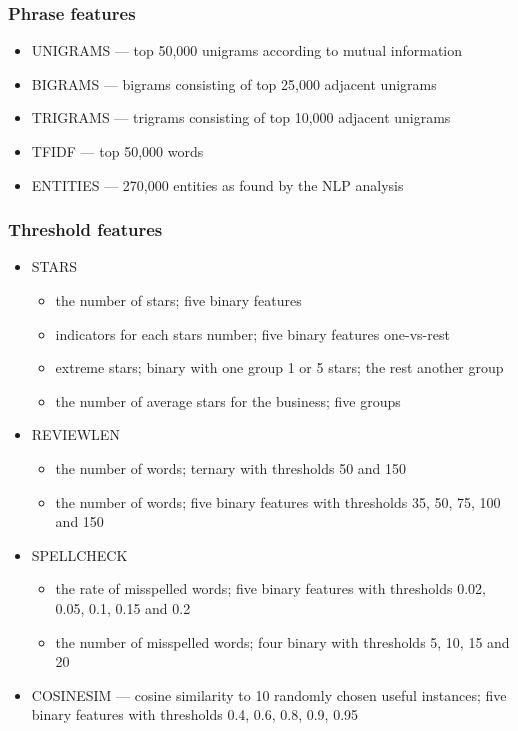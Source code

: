 \subsubsection*{Phrase features}

\begin{itemize}
	\item UNIGRAMS --- top 50,000 unigrams according to mutual information
	\item BIGRAMS --- bigrams consisting of top 25,000 adjacent unigrams
	\item TRIGRAMS  --- trigrams consisting of top 10,000 adjacent unigrams
	\item TFIDF  --- top 50,000 words
	\item ENTITIES --- 270,000 entities as found by the NLP analysis
\end{itemize}

\subsubsection*{Threshold features}

\begin{itemize}
	\item STARS 
		\begin{itemize}
			\item the number of stars; five binary features
			\item indicators for each stars number; five binary features one-vs-rest
			\item extreme stars; binary with one group 1 or 5 stars; the rest another group
			\item the number of average stars for the business; five groups
		\end{itemize}
	\item REVIEWLEN 
		\begin{itemize}
			\item the number of words; ternary with thresholds 50 and 150
			\item the number of words; five binary features with thresholds 35, 50, 75, 100 and 150
		\end{itemize}
	\item SPELLCHECK 
		\begin{itemize}
			\item the rate of misspelled words; five binary features with thresholds 0.02, 0.05, 0.1, 0.15 and 0.2
			\item the number of misspelled words; four binary with thresholds 5, 10, 15 and 20
		\end{itemize}
	
	\item COSINESIM --- cosine similarity to 10 randomly chosen useful instances; five binary features with thresholds 0.4, 0.6, 0.8, 0.9, 0.95
\end{itemize}

